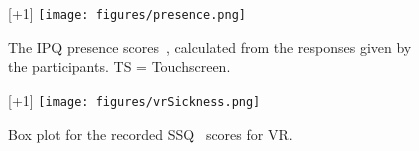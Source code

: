 \begin{figure}[t]
    \centering
    \begin{minipage}[t]{0.49\columnwidth}
        \centering
        \raisebox{0pt}[\dimexpr\height+1\baselineskip\relax]{
            \texttt{[image: figures/presence.png]}
        }
        \caption{The IPQ presence scores~\cite{ipq}, calculated from the responses given by the participants. TS = Touchscreen.}
        \label{fig:presence}
    \end{minipage}
    \hfill
    \begin{minipage}[t]{0.49\columnwidth}
        \centering
        \raisebox{26pt}[\dimexpr\height+1\baselineskip\relax]{
            \texttt{[image: figures/vrSickness.png]}
        }
        \caption{Box plot for the recorded SSQ~\cite{ssqOriginal, ssqFix} scores for VR.}
        \label{fig:vrSickness}
    \end{minipage}
\end{figure}

